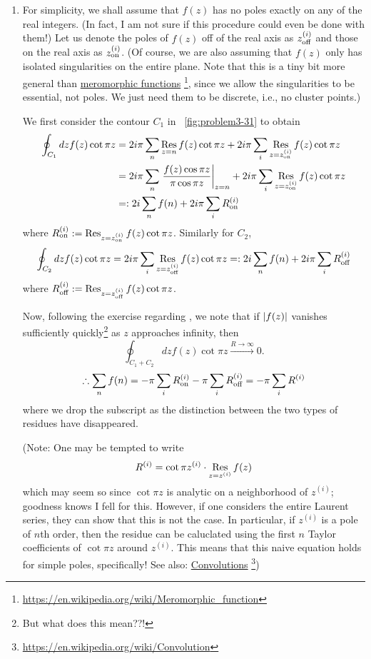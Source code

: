\begin{enumerate}[wide, labelindent = 0pt, label = (\alph*)]
\item
For simplicity, we shall assume that $f(z)$ has no poles exactly on any of the real integers.
(In fact, I am not sure if this procedure could even be done with them!)
Let us denote the poles of $f(z)$ off of the real axis as $z_{\text{off}}^{\left( i \right)}$
and those on the real axis as $z_{\text{on}}^{\left( i \right)}$.
(Of course, we are also assuming that $f(z)$ only has isolated singularities on the entire plane.
Note that this is a tiny bit more general than \href{https://en.wikipedia.org/wiki/Meromorphic_function}{meromorphic functions}%
\footnote{\url{https://en.wikipedia.org/wiki/Meromorphic_function}}, since we allow the singularities to be essential, not poles.
We just need them to be discrete, i.e., no cluster points.)

We first consider the contour $C_1$ in ~\ref{fig:problem3-31} to obtain
\begin{align*}
    \oint_{C_1} dz f(z) \cot \pi z
    &= 2i\pi \sum_n \mathop{\mathrm{Res}}_{z=n}{f(z) \cot \pi z} + 2i\pi \sum_i \mathop{\mathrm{Res}}_{z=z_{\text{on}}^{\left( i \right)}}{f(z) \cot \pi z} \\
    &= 2i\pi \sum_n {\left. \frac{f(z) \cos \pi z}{\pi \cos \pi z} \right|}_{z=n}
     + 2i\pi \sum_i \mathop{\mathrm{Res}}_{z=z_{\text{on}}^{\left( i \right)}}{f(z) \cot \pi z} \\
    &=: 2i \sum_n f(n) + 2i\pi \sum_i R_{\text{on}}^{\left( i \right)}
\end{align*}
where $R_{\text{on}}^{\left( i \right)} := \mathop{\mathrm{Res}}_{z=z_{\text{on}}^{\left( i \right)}}{f(z) \cot \pi z}$.
Similarly for $C_2$,
\[
    \oint_{C_2} dz f(z) \cot \pi z
    = 2i\pi \sum_i \mathop{\mathrm{Res}}_{z=z_{\text{off}}^{\left( i \right)}}{f(z) \cot \pi z}
    =: 2i \sum_n f(n) + 2i\pi \sum_i R_{\text{off}}^{\left( i \right)}
\]
where $R_{\text{off}}^{\left( i \right)} := \mathop{\mathrm{Res}}_{z=z_{\text{off}}^{\left( i \right)}}{f(z) \cot \pi z}$.

Now, following the exercise regarding , we note that
if $\left| f(z) \right|$ vanishes sufficiently quickly\footnote{But what does this mean??!} as $z$ approaches infinity,
then
\[
    \oint_{C_1 + C_2} dz f(z) \cot \pi z \xrightarrow{R \rightarrow \infty} 0.
\]
\[
    \therefore \sum_n f(n)
    = -\pi \sum_i R_{\text{on}}^{\left( i \right)} - \pi \sum_i R_{\text{off}}^{\left( i \right)}
    = -\pi \sum_i R^{(i)}
\]
where we drop the subscript as the distinction between the two types of residues have disappeared.

(Note: One may be tempted to write
\[
    R^{(i)} = \cot \pi z^{(i)} \cdot \mathop{\mathrm{Res}}_{z=z^{(i)}}{f(z)}
\]
which may seem so since $\cot \pi z$ is analytic on a neighborhood of $z^{(i)}$;
goodness knows I fell for this.
However, if one considers the entire Laurent series, they can show that this is not the case.
In particular, if $z^{(i)}$ is a pole of $n$th order,
then the residue can be caluclated using the first $n$ Taylor coefficients of $\cot \pi z$ around $z^{(i)}$.
This means that this naive equation holds for simple poles, specifically!
See also: \href{https://en.wikipedia.org/wiki/Convolution}{Convolutions}%
\footnote{\url{https://en.wikipedia.org/wiki/Convolution}})


\end{enumerate}
